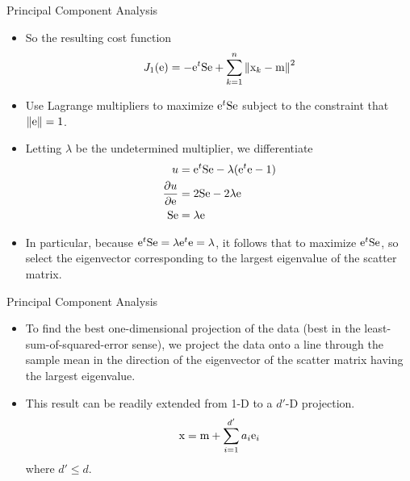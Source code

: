 \begin{frame}{Principal Component Analysis}
\begin{footnotesize}
\begin{itemize}
\item So the resulting cost function
\begin{equation}
{J_1}({\rm e}) =  - {{\rm e}^t}{\rm S}{\rm e} + \sum\limits_{k = 1}^n {{{\left\| {{{\rm x}_k} - {\rm m}} \right\|}^2}} \nonumber
\end{equation}
\item Use Lagrange multipliers to maximize ${\rm e}^t{\rm S}{\rm e}$ subject to the constraint that $\left\|{\rm e}\right\|=1$. 
\item Letting $\lambda$ be the undetermined multiplier, we differentiate
\begin{align}
u&={\rm e}^t{\rm S}{\rm e} -\lambda({\rm e}^t{\rm e}-1)\nonumber\\
\frac{{\partial u}}{{\partial {\rm e}}} &= 2{\rm S}{\rm e} - 2\lambda {\rm e}\nonumber\\
{\rm S}{\rm e}&=\lambda {\rm e}\nonumber
\end{align}
\item In particular, because ${\rm e}^t{\rm S}{\rm e}=\lambda {\rm e}^t{\rm e}=\lambda$, it follows that to maximize ${\rm e}^t{\rm S}{\rm e}$, so select the eigenvector corresponding to the largest eigenvalue of the scatter matrix.
\end{itemize}
\end{footnotesize}
\end{frame}

\begin{frame}{Principal Component Analysis}
\begin{itemize}
\setlength{\itemsep}{12pt}
\item To find the best one-dimensional projection of the data (best in the least-sum-of-squared-error sense), we project the data onto a line through the sample mean in the direction of the eigenvector of the scatter matrix having the largest eigenvalue.
\item This result can be readily extended from 1-D to a $d'$-D projection.
\begin{equation}
{\rm x} = {\rm m} + \sum\limits_{i = 1}^{{d'}} {{a_i}{{\rm e}_i}} \nonumber
\end{equation}
where $d'\leq d$.
\end{itemize}
\end{frame}

